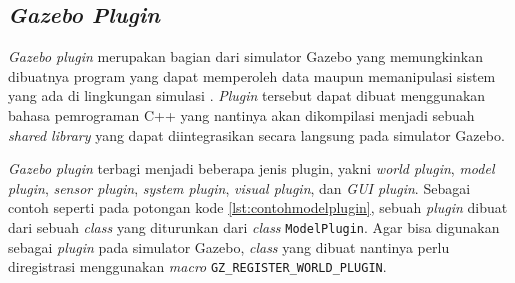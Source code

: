 \subsection{\emph{Gazebo Plugin}}
\label{subsec:gazeboplugin}

\emph{Gazebo plugin} merupakan bagian dari simulator Gazebo yang memungkinkan dibuatnya program yang dapat memperoleh data maupun memanipulasi sistem yang ada di lingkungan simulasi \citep{url:gazeboplugin}.
\emph{Plugin} tersebut dapat dibuat menggunakan bahasa pemrograman C++ yang nantinya akan dikompilasi menjadi sebuah \emph{shared library} yang dapat diintegrasikan secara langsung pada simulator Gazebo.



\emph{Gazebo plugin} terbagi menjadi beberapa jenis plugin,
  yakni \emph{world plugin}, \emph{model plugin}, \emph{sensor plugin}, \emph{system plugin}, \emph{visual plugin}, dan \emph{GUI plugin}.
Sebagai contoh seperti pada potongan kode \ref{lst:contohmodelplugin},
  sebuah \emph{plugin} dibuat dari sebuah \emph{class} yang diturunkan dari \emph{class} \lstinline{ModelPlugin}.
Agar bisa digunakan sebagai \emph{plugin} pada simulator Gazebo,
  \emph{class} yang dibuat nantinya perlu diregistrasi menggunakan \emph{macro} \lstinline{GZ_REGISTER_WORLD_PLUGIN}.
